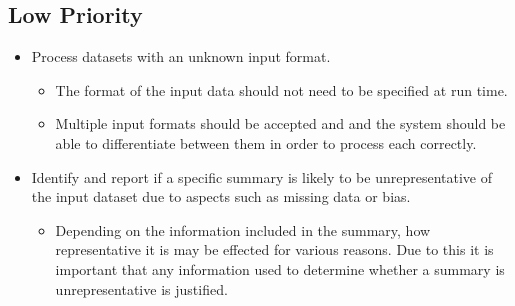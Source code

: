 \subsection{Low Priority}
\begin{itemize}
    \item Process datasets with an unknown input format.
    \begin{itemize}
        \item The format of the input data should not need to be specified at run time.
        \item Multiple input formats should be accepted and and the system should be able to differentiate between them in order to process each correctly.
    \end{itemize}
    \item Identify and report if a specific summary is likely to be unrepresentative of the input dataset due to aspects such as missing data or bias.
    \begin{itemize}
        \item Depending on the information included in the summary, how representative it is may be effected for various reasons. Due to this it is important that any information used to determine whether a summary is unrepresentative is justified.
    \end{itemize}
\end{itemize}